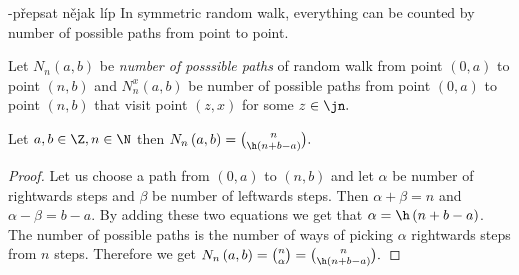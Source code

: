 \begin{rem}\ce-přepsat nějak líp
 In symmetric random walk, everything can be counted by number of possible paths from point to point.
\end{rem}

\begin{defn}\label{defn-number_possible_paths}
 Let $N_n \left( a,b \right) $ be \emph{number of posssible paths} of random walk \rw from point $ \left( 0,a \right) $ to point $ \left( n,b \right)$
 and $N_n^x \left( a,b \right) $ be number of possible paths from point $ \left( 0,a \right) $ to point $\left( n,b \right)$
 that visit point $\left(z,x\right)$ for some $z \in \jn.$
\end{defn}
\begin{thm}\label{thm-number_of_possible_paths}
 Let $a,b \in \Z, n \in \N$ then $N_n \left( a,b \right) =\binom{n}{\h \left(n+b-a \right)}.$
\end{thm}
\begin{proof}
 Let us choose a path from $ \left( 0,a \right) $ to $ \left( n,b \right) $ and let $\alpha$ be number of rightwards steps and $\beta$ be number of leftwards steps.
 Then $\alpha+\beta=n$ and $\alpha-\beta=b-a$. By adding these two equations we get that $\alpha=\h \left( n+b-a \right) $.
 The number of possible paths is the number of ways of picking $\alpha$ rightwards steps from $n$ steps.
 Therefore we get $N_n \left( a,b \right) =\binom{n}{\alpha}=\binom{n}{\h \left( n+b-a \right) }.$
\end{proof}

